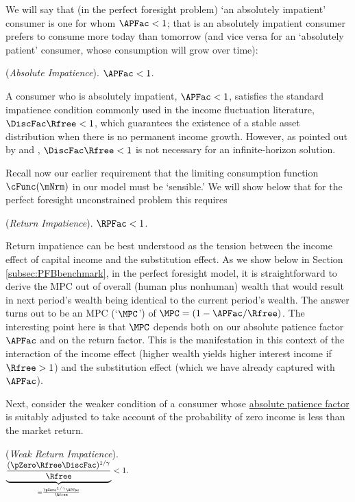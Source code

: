 \documentclass[BufferStockTheory]{subfiles}
\begin{document}
We will say that (in the perfect foresight problem) `an absolutely impatient' consumer is one for whom $\APFac < 1$; that is an absolutely impatient consumer prefers to consume more today than tomorrow (and vice versa for an `absolutely patient' consumer, whose consumption will grow over time):
\hypertarget{AIC}{}
\begin{assumL} (\textit{Absolute Impatience}). \label{ass:AIC}
$\APFac  < 1$. 
\end{assumL}

A consumer who is absolutely impatient, $\APFac<1$, satisfies the standard impatience condition commonly used in the income fluctuation literature, $\DiscFac\Rfree<1$, which guarantees the existence of a stable asset distribution when there is no permanent income growth.
However, as pointed out by \cite{szeidlInvariant} and \cite{maUnboundedDP}, $\DiscFac\Rfree<1$ is not necessary for an infinite-horizon solution.

\hypertarget{RIC}{}
Recall now our earlier requirement that the limiting consumption function $\cFunc(\mNrm)$ in our model must be `sensible.'
We will show below that for the perfect foresight unconstrained problem this requires
\begin{assumL} (\textit{Return Impatience}).\label{ass:RIC}
$\RPFac  < 1$. 
\end{assumL}

Return impatience can be best understood as the tension between the income effect of capital income and the substitution effect.
As we show below in Section \ref{subsec:PFBbenchmark}, in the perfect foresight model, it is straightforward to derive the MPC out of overall (human plus nonhuman) wealth that would result in next period's wealth being identical to the current period's wealth.
The answer turns out to be an MPC (`$\MPC$') of $\MPC=(1-\APFac/\Rfree)$.
The interesting point here is that $\MPC$ depends both on our absolute patience factor $\APFac$ and on the return factor.
This is the manifestation in this context of the interaction of the income effect (higher wealth yields higher interest income if $\Rfree>1$) and the substitution effect (which we have already captured with $\APFac$).


Next, consider the weaker condition of a consumer whose \hyperlink{APFac}{absolute patience factor} is suitably adjusted to take account of the probability of zero income is less than the market return.

%
\hypertarget{WRIC}{}
\begin{assumL} (\textit{Weak Return Impatience}). \label{ass:WRIC}
$\underbrace{\frac{(\pZero \Rfree \DiscFac)^{1/\CRRA}}{\Rfree}}_{ = \frac{\pZero^{1/\CRRA} \APFac}{\Rfree}} < 1. \phantom{\text{{\WRIC}:~~}}$
%
\end{assumL}
\end{document}
